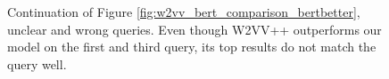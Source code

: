 \begin{figure}
    \centering
    
    \caption[Comparison between W2VV++ and our BERT extension, unclear and wrong queries]{Continuation of Figure \ref{fig:w2vv_bert_comparison_bertbetter}, unclear and wrong queries. Even though W2VV++ outperforms our model on the first and third query, its top results do not match the query well.}
    \label{fig:w2vv_bert_comparison_wrong}
\end{figure}






